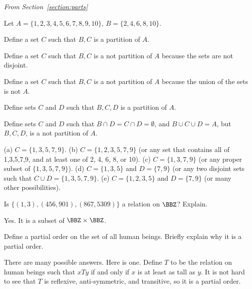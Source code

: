 \medskip
\noindent
{\em From Section~\ref{section:parts}}

\begin{requ}
Let $A=\{1,2,3,4,5,6,7,8,9,10\}$, $B=\{2,4,6,8,10\}$.
\begin{lenum}
\item Define a set $C$ such that $B, C$ is a partition of $A$. 
\item Define a set $C$ such that $B, C$ is a not partition of $A$ because the sets are not disjoint. 
\item Define a set $C$ such that $B, C$ is a not partition of $A$ because the union of the sets is not $A$.
\item Define sets $C$ and $D$ such that $B, C, D$ is a partition of $A$. 
\item Define sets $C$ and $D$ such that $B\cap D=C\cap D=\emptyset$, 
and $B\cup C\cup D=A$, but $B, C, D$,  is a not partition of $A$. 
\end{lenum}
\begin{requanswer}
(a) $C=\{1,3,5,7,9\}$.
(b) $C=\{1,2,3,5,7,9\}$ (or any set that contains all of 1,3,5,7,9, and at least one of 2, 4, 6, 8, or 10).
(c) $C=\{1,3,7,9\}$ (or any proper subset of $\{1,3,5,7,9\}$).
(d) $C=\{1,3,5\}$ and $D=\{7,9\}$ (or any two disjoint sets such that $C\cup D=\{1,3,5,7,9\}$.
(e) $C=\{1,2,3,5\}$ and $D=\{7,9\}$ (or many other possibilities).
\end{requanswer}
\end{requ}

\begin{requ}
Is $\{(1,3), (456, 901), (867,5309)\}$ a relation on $\BBZ$? Explain.
\begin{requanswer}
Yes. It is a subset of $\BBZ\times\BBZ$.
\end{requanswer}
\end{requ}


\begin{requ}
Define a partial order on the set of all human beings. Briefly explain why it is a partial order.
\begin{requanswer}
There are many possible answers. Here is one.
Define $T$ to be the relation on human beings such that $x T y$ if and only if $x$ is at least as tall as $y$.
It is not hard to see that $T$ is reflexive, anti-symmetric, and transitive, so it is a partial order.
\end{requanswer}
\end{requ}

